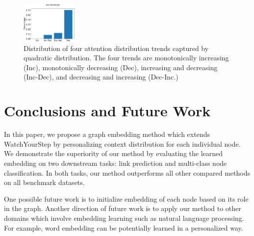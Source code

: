 \documentclass{article}
\begin{document}
\begin{figure}
    \includegraphics[width=0.245\textwidth]{cs699/fig/soc-facebook_quad.pdf}
    \caption{Distribution of four attention distribution trends captured by quadratic distribution. The four trends are monotonically increasing (Inc), monotonically decreasing (Dec), increasing and decreasing (Inc-Dec), and decreasing and increasing (Dec-Inc.)}
    \label{fig:dist_mirror}
\end{figure}


\section{Conclusions and Future Work}
In this paper, we propose a graph embedding method which extends WatchYourStep by personalizing context distribution for each individual node. We demonstrate the superiority of our method by evaluating the learned embedding on two downstream tasks: link prediction and multi-class node classification. In both tasks, our method outperforms all other compared methods on all benchmark datasets. 

One possible future work is to initialize embedding of each node based on its role in the graph. Another direction of future work is to apply our method to other domains which involve embedding learning such as natural language processing. For example, word embedding can be potentially learned in a personalized way.




\end{document}
